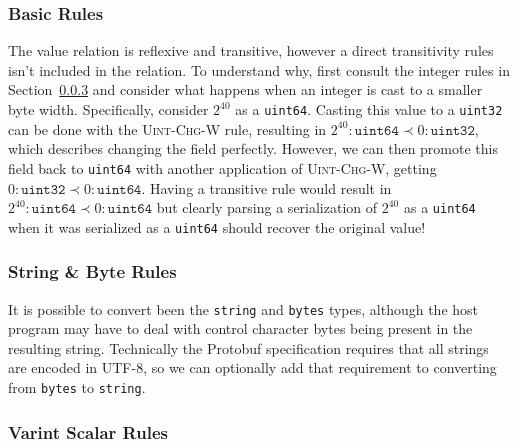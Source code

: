 \subsubsection{Basic Rules}

The value relation is reflexive and transitive, however a direct transitivity
rules isn't included in the relation. To understand why, first consult the
integer rules in Section~\ref{sec:proto-compat-ints} and consider what happens
when an integer is cast to a smaller byte width. Specifically, consider $2^{40}$
as a \texttt{uint64}. Casting this value to a \texttt{uint32} can be done with
the \textsc{Uint-Chg-W} rule, resulting in $2^{40} : \mathtt{uint64} \prec 0 :
\mathtt{uint32}$, which describes changing the field perfectly. However, we can
then promote this field back to \texttt{uint64} with another application of
\textsc{Uint-Chg-W}, getting $0 : \mathtt{uint32} \prec 0 :
\mathtt{uint64}$. Having a transitive rule would result in $2^{40} :
\mathtt{uint64} \prec 0 : \mathtt{uint64}$ but clearly parsing a serialization
of $2^{40}$ as a \texttt{uint64} when it was serialized as a \texttt{uint64}
should recover the original value!

\begin{mathpar}

\end{mathpar}

\subsubsection{String \& Byte Rules}

It is possible to convert been the \texttt{string} and \texttt{bytes} types,
although the host program may have to deal with control character bytes being
present in the resulting string. Technically the Protobuf specification requires
that all strings are encoded in UTF-8, so we can optionally add that requirement
to converting from \texttt{bytes} to \texttt{string}.

\begin{mathpar}

\end{mathpar}

\subsubsection{Varint Scalar Rules}\label{sec:proto-compat-ints}

